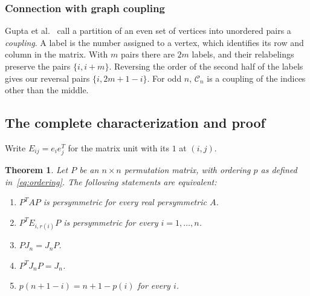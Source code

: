 \documentclass[11pt,a4paper]{article}
\newtheorem{theorem}{Theorem}
\begin{document}
\subsubsection{Connection with graph coupling}
Gupta et al.~\cite[Definition 5.2, p.~29]{gupta-et-al-coupling} call a
partition of an even set of vertices into unordered pairs a \emph{coupling}.
A label is the number assigned to a vertex, which identifies its row
and column in the matrix. With $m$ pairs there are $2m$ labels, and their
relabelings preserve the pairs $\{i,i+m\}$. Reversing the order of the
second half of the labels gives our reversal pairs $\{i,2m+1-i\}$.
For odd $n$, $\mathcal C_n$ is a coupling of the indices other than the middle.

\newpage
\subsection{The complete characterization and proof}
Write $E_{ij}=e_i e_j^T$ for the matrix unit with its $1$ at $(i,j)$.
\begin{theorem}\label{thm:classification}
Let $P$ be an $n\times n$ permutation matrix, with ordering $p$ as defined
in~\eqref{eq:ordering}. The following statements are equivalent:
\begin{enumerate}
 \renewcommand{\labelenumi}{(\roman{enumi})}
 \item $P^TAP$ is persymmetric for every real persymmetric $A$.
 \item $P^TE_{i,r(i)}P$ is persymmetric for every $i=1,\ldots,n$.
 \item $PJ_n=J_n P$.
 \item $P^TJ_n P=J_n$.
 \item $p(n+1-i)=n+1-p(i)$ for every $i$.
\end{enumerate}
\end{theorem}
\end{document}
